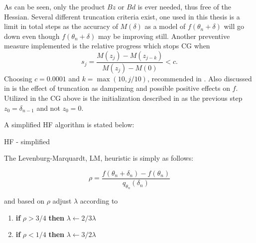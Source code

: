 As can be seen, only the product $Bz$ or $Bd$ is ever needed, thus free of the Hessian. Several different truncation criteria exist, one used in this thesis is a limit in total steps as the accuracy of $M(\delta)$ as a model of $f(\theta_n + \delta)$ will go down even though $f(\theta_n + \delta)$ may be improving still. Another preventive measure implemented is the relative progress which stops CG when \[s_j = \frac{M(z_j) - M(z_{j-k})}{M(z_j) - M(0)} < c.\]  Choosing $c = 0.0001$ and $k= \max (10, j/10)$, recommended in \cite{suts}. Also discussed in \textcite{Martens2012} is the effect of truncation as dampening and possible positive effects on $f$. Utilized in the CG above is the initialization described in \cite{Martens2012} as the previous step $z_0 = \delta_{n-1}$ and not $z_0 = 0$.

A simplified HF algorithm is stated below:

\begin{algorithm}
    \caption{HF - simplified}
    \begin{algorithmic}[1]
        \EndFor
    \end{algorithmic}
\end{algorithm}

The Levenburg-Marquardt, LM, heuristic is simply as follows:

\[ \rho = \frac{f(\theta_n + \delta_n) - f(\theta_n)}{q_{\theta_n} (\delta_n)}\]

and based on $\rho$ adjust $\lambda$ according to

\begin{enumerate}
    \item \textbf{if} $\rho > 3/4 $ \textbf{then} $\lambda\gets 2/3 \lambda$
    \item \textbf{if} $\rho<1/4$ \textbf{then} $\lambda \gets 3/2\lambda$
\end{enumerate}   
    

